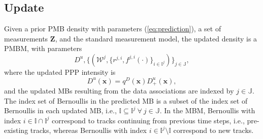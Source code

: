 \documentclass[journal]{IEEEtran}
\begin{document}
\subsection{Update}

Given a prior PMB density with parameters (\ref{eq:prediction}), a set of measurements $\mathbf{Z}$, and the standard measurement model, the updated density is a PMBM, with parameters
\begin{equation}
D^u, \{(\mathcal{W}^j,\{r^{j,i},f^{j,i}(\cdot)\}_{i\in\mathbb{I}^j})\}_{j\in\mathbb{J}},
\label{eq:update2}
\end{equation}
where the updated PPP intensity is
\begin{equation}
    D^u(\mathbf{x}) = q^D(\mathbf{x})D_+^u(\mathbf{x}),
\end{equation}
and the updated MBs resulting from the data associations are indexed by $j\in\mathbb{J}$. The index set of Bernoullis in the predicted MB is a subset of the index set of Bernoullis in each updated MB, i.e., $\mathbb{I}\subseteq\mathbb{I}^j~\forall~j\in\mathbb{J}$. In the MBM, Bernoullis with index $i\in\mathbb{I}\cap\mathbb{I}^j$ correspond to tracks continuing from previous time steps, i.e., pre-existing tracks, whereas Bernoullis with index $i\in\mathbb{I}^j\setminus\mathbb{I}$ correspond to new tracks.
\end{document}
